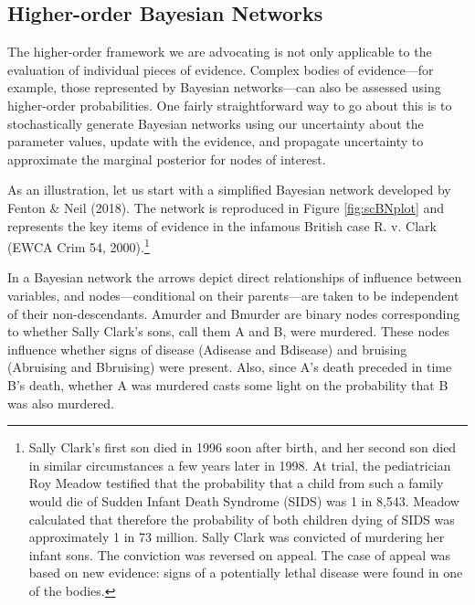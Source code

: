 \documentclass[
  10pt,
  dvipsnames,enabledeprecatedfontcommands]{scrartcl}
\begin{document}
\hypertarget{higher-order-bayesian-networks}{%
\subsection{Higher-order Bayesian
Networks}\label{higher-order-bayesian-networks}}

The higher-order framework we are advocating is not only applicable to
the evaluation of individual pieces of evidence. Complex bodies of
evidence---for example, those represented by Bayesian networks---can
also be assessed using higher-order probabilities. One fairly
straightforward way to go about this is to stochastically generate
Bayesian networks using our uncertainty about the parameter values,
update with the evidence, and propagate uncertainty to approximate the
marginal posterior for nodes of interest.

As an illustration, let us start with a simplified Bayesian network
developed by Fenton \& Neil (2018). The network is reproduced in Figure
\ref{fig:scBNplot} and represents the key items of evidence in the
infamous British case R. v. Clark (EWCA Crim 54, 2000).\footnote{Sally
  Clark's first son died in 1996 soon after birth, and her second son
  died in similar circumstances a few years later in 1998. At trial, the
  pediatrician Roy Meadow testified that the probability that a child
  from such a family would die of Sudden Infant Death Syndrome (SIDS)
  was 1 in 8,543. Meadow calculated that therefore the probability of
  both children dying of SIDS was approximately 1 in 73 million. Sally
  Clark was convicted of murdering her infant sons. The conviction was
  reversed on appeal. The case of appeal was based on new evidence:
  signs of a potentially lethal disease were found in one of the bodies.}

In a Bayesian network the arrows depict direct relationships of
influence between variables, and nodes---conditional on their
parents---are taken to be independent of their non-descendants.
\textsf{Amurder} and \textsf{Bmurder} are binary nodes corresponding to
whether Sally Clark's sons, call them A and B, were murdered. These
nodes influence whether signs of disease (\textsf{Adisease} and
\textsf{Bdisease}) and bruising (\textsf{Abruising} and
\textsf{Bbruising}) were present. Also, since A's death preceded in time
B's death, whether A was murdered casts some light on the probability
that B was also murdered.
\end{document}
